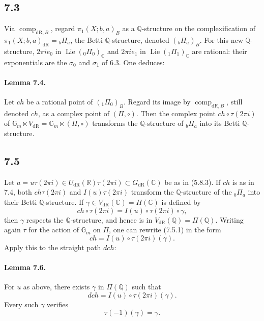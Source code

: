 \documentclass[11pt]{article}
\newcommand{\Q}{\mathbb Q}
\newcommand{\R}{\mathbb R}
\newcommand{\C}{\mathbb C}
\newcommand{\Gm}{\mathbb G_m}
\newcommand{\Lie}{\operatorname{Lie}}
\newcommand{\comp}{\operatorname{comp}}
\newcommand{\dR}{\mathrm{dR}}
\begin{document}
\subsection*{7.3}
Via $\comp_{\dR,B}$, regard $\pi_1(X;b,a)_B$ as a $\Q$-structure on the complexification of $\pi_1(X;b,a)_{\dR}={}_b\Pi_a$, the Betti $\Q$-structure, denoted $({}_b\Pi_a)_B$.
For this new $\Q$-structure, $2\pi i e_0$ in $\Lie({}_0\Pi_0)_\C$ and $2\pi i e_1$ in $\Lie({}_1\Pi_1)_\C$ are rational: their exponentials are the $\sigma_0$ and $\sigma_1$ of 6.3.
One deduces:

\paragraph{Lemma 7.4.}
Let $ch$ be a rational point of $({}_1\Pi_0)_B$.
Regard its image by $\comp_{\dR,B}$, still denoted $ch$, as a complex point of $(\Pi,\circ)$.
Then the complex point $ch\circ\tau(2\pi i)$ of $\Gm\ltimes V_{\dR}=\Gm\ltimes(\Pi,\circ)$ transforms the $\Q$-structure of ${}_b\Pi_a$ into its Betti $\Q$-structure.

\subsection*{7.5}
Let $a=u\tau(2\pi i)\in U_{\dR}(\R)\tau(2\pi i)\subset G_{\dR}(\C)$ be as in (5.8.3).
If $ch$ is as in 7.4, both $ch\tau(2\pi i)$ and $I(u)\tau(2\pi i)$ transform the $\Q$-structure of the ${}_b\Pi_a$ into their Betti $\Q$-structure.
If $\gamma\in V_{\dR}(\C)=\Pi(\C)$ is defined by
\begin{equation}
 ch\circ\tau(2\pi i)=I(u)\circ\tau(2\pi i)\circ\gamma,
\tag{7.5.1}
\end{equation}
then $\gamma$ respects the $\Q$-structure, and hence is in $V_{\dR}(\Q)=\Pi(\Q)$.
Writing again $\tau$ for the action of $\Gm$ on $\Pi$, one can rewrite (7.5.1) in the form
\[
 ch=I(u)\circ\tau(2\pi i)(\gamma).
\]
Apply this to the straight path $dch$:

\paragraph{Lemma 7.6.}
For $u$ as above, there exists $\gamma$ in $\Pi(\Q)$ such that
\begin{equation}
 dch=I(u)\circ\tau(2\pi i)(\gamma).
\tag{7.6.1}
\end{equation}
Every such $\gamma$ verifies
\begin{equation}
 \tau(-1)(\gamma)=\gamma.
\tag{7.6.2}
\end{equation}
\end{document}

